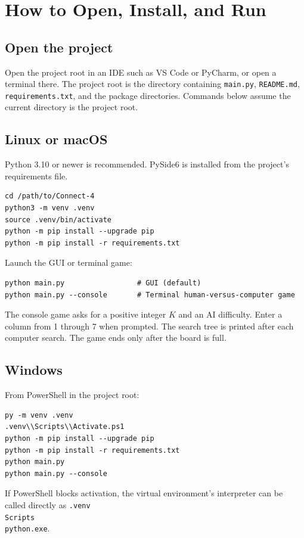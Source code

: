 \documentclass[11pt,a4paper]{article}
\begin{document}
\section{How to Open, Install, and Run}\label{sec:run}

\subsection{Open the project}
Open the project root in an IDE such as VS Code or PyCharm, or open a terminal
there. The project root is the directory containing \texttt{main.py},
\texttt{README.md}, \texttt{requirements.txt}, and the package directories.
Commands below assume the current directory is the project root.

\subsection{Linux or macOS}
Python 3.10 or newer is recommended. PySide6 is installed from the project's
requirements file.
\begin{lstlisting}
cd /path/to/Connect-4
python3 -m venv .venv
source .venv/bin/activate
python -m pip install --upgrade pip
python -m pip install -r requirements.txt
\end{lstlisting}

Launch the GUI or terminal game:
\begin{lstlisting}
python main.py                 # GUI (default)
python main.py --console       # Terminal human-versus-computer game
\end{lstlisting}

The console game asks for a positive integer $K$ and an AI difficulty. Enter a
column from 1 through 7 when prompted. The search tree is printed after each
computer search. The game ends only after the board is full.

\subsection{Windows}
From PowerShell in the project root:
\begin{lstlisting}
py -m venv .venv
.venv\\Scripts\\Activate.ps1
python -m pip install --upgrade pip
python -m pip install -r requirements.txt
python main.py
python main.py --console
\end{lstlisting}

If PowerShell blocks activation, the virtual environment's interpreter can be
called directly as \texttt{.venv\\Scripts\\python.exe}.
\end{document}
